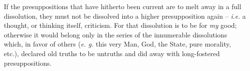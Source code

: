 If the presuppositions that have hitherto been current are to melt away in a 
full dissolution, they must not be dissolved into a higher presupposition 
again -- \textit{i.e.} a thought, or thinking itself, criticism. For that 
dissolution is to be for \textit{my} good; otherwise it would belong only in 
the series of the innumerable dissolutions which, in favor of others 
(\textit{e. g.} this very Man, God, the State, pure morality, etc.), declared 
old truths to be untruths and did away with long-fostered presuppositions.
